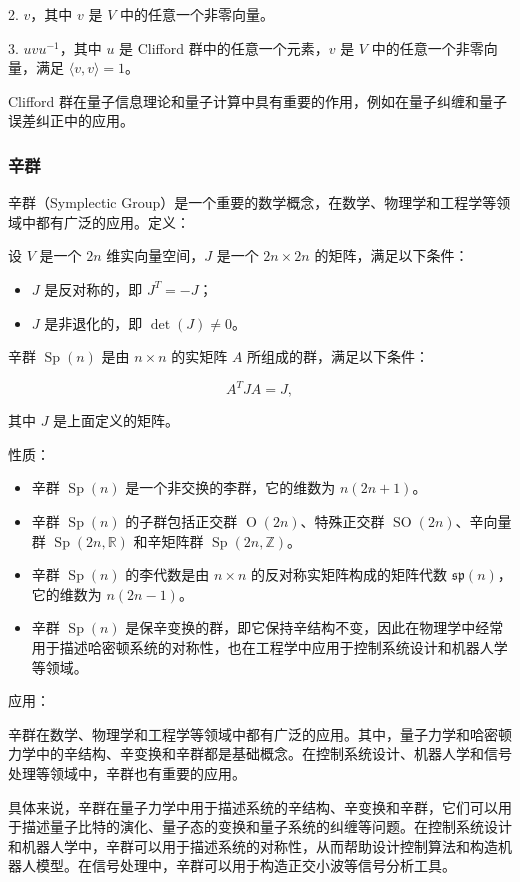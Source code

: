 \documentclass[UTF8,a4paper,11pt]{article}
\begin{document}
2. $v$，其中 $v$ 是 $V$ 中的任意一个非零向量。

3. $uvu^{-1}$，其中 $u$ 是 Clifford 群中的任意一个元素，$v$ 是 $V$ 中的任意一个非零向量，满足 $\langle v,v\rangle = 1$。

Clifford 群在量子信息理论和量子计算中具有重要的作用，例如在量子纠缠和量子误差纠正中的应用。

\subsubsection{辛群}
辛群（Symplectic Group）是一个重要的数学概念，在数学、物理学和工程学等领域中都有广泛的应用。定义：

设 $V$ 是一个 $2n$ 维实向量空间，$J$ 是一个 $2n\times 2n$ 的矩阵，满足以下条件：
\begin{itemize}
\item $J$ 是反对称的，即 $J^T = -J$；
\item $J$ 是非退化的，即 $\det(J) \neq 0$。
\end{itemize}
辛群 $\operatorname{Sp}(n)$ 是由 $n\times n$ 的实矩阵 $A$ 所组成的群，满足以下条件：

$$A^TJA = J,$$

其中 $J$ 是上面定义的矩阵。

性质：
\begin{itemize}
\item 辛群 $\operatorname{Sp}(n)$ 是一个非交换的李群，它的维数为 $n(2n+1)$。
\item 辛群 $\operatorname{Sp}(n)$ 的子群包括正交群 $\operatorname{O}(2n)$、特殊正交群 $\operatorname{SO}(2n)$、辛向量群 $\operatorname{Sp}(2n,\mathbb{R})$ 和辛矩阵群 $\operatorname{Sp}(2n,\mathbb{Z})$。
\item 辛群 $\operatorname{Sp}(n)$ 的李代数是由 $n\times n$ 的反对称实矩阵构成的矩阵代数 $\mathfrak{sp}(n)$，它的维数为 $n(2n-1)$。
\item 辛群 $\operatorname{Sp}(n)$ 是保辛变换的群，即它保持辛结构不变，因此在物理学中经常用于描述哈密顿系统的对称性，也在工程学中应用于控制系统设计和机器人学等领域。
\end{itemize}

应用：

辛群在数学、物理学和工程学等领域中都有广泛的应用。其中，量子力学和哈密顿力学中的辛结构、辛变换和辛群都是基础概念。在控制系统设计、机器人学和信号处理等领域中，辛群也有重要的应用。

具体来说，辛群在量子力学中用于描述系统的辛结构、辛变换和辛群，它们可以用于描述量子比特的演化、量子态的变换和量子系统的纠缠等问题。在控制系统设计和机器人学中，辛群可以用于描述系统的对称性，从而帮助设计控制算法和构造机器人模型。在信号处理中，辛群可以用于构造正交小波等信号分析工具。
\end{document}
